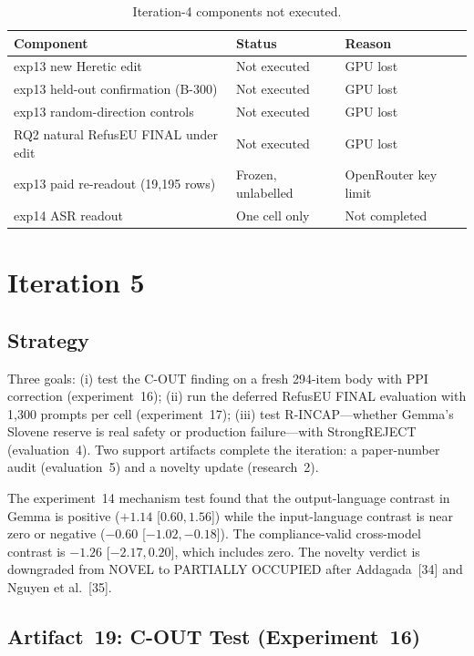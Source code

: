 \documentclass[11pt,letterpaper]{article}
\begin{document}
\begin{table}[!htbp]
\centering
\caption{Iteration-4 components not executed.}
\label{tab:not_exec_iter4}
{\small
\begin{tabularx}{\linewidth}{lXl}
\toprule
Component & Status & Reason \\
\midrule
exp13 new Heretic edit & Not executed & GPU lost \\
exp13 held-out confirmation (B-300) & Not executed & GPU lost \\
exp13 random-direction controls & Not executed & GPU lost \\
RQ2 natural RefusEU FINAL under edit & Not executed & GPU lost \\
exp13 paid re-readout (19,195 rows) & Frozen, unlabelled & OpenRouter key limit \\
exp14 ASR readout & One cell only & Not completed \\
\bottomrule
\end{tabularx}
}
\end{table}


\section{Iteration 5}

\subsection{Strategy}

Three goals: (i) test the C-OUT finding on a fresh 294-item body with PPI correction (experiment~16); (ii) run the deferred RefusEU FINAL evaluation with 1,300 prompts per cell (experiment~17); (iii) test R-INCAP---whether Gemma's Slovene reserve is real safety or production failure---with StrongREJECT (evaluation~4). Two support artifacts complete the iteration: a paper-number audit (evaluation~5) and a novelty update (research~2).

The experiment~14 mechanism test found that the output-language contrast in Gemma is positive ($+1.14$ [$0.60, 1.56$]) while the input-language contrast is near zero or negative ($-0.60$ [$-1.02, -0.18$]). The compliance-valid cross-model contrast is $-1.26$ [$-2.17, 0.20$], which includes zero. The novelty verdict is downgraded from NOVEL to PARTIALLY OCCUPIED after Addagada~[34] and Nguyen et al.~[35].

\subsection{Artifact~19: C-OUT Test (Experiment~16)}
\label{gen_art_experiment_16}
\end{document}
